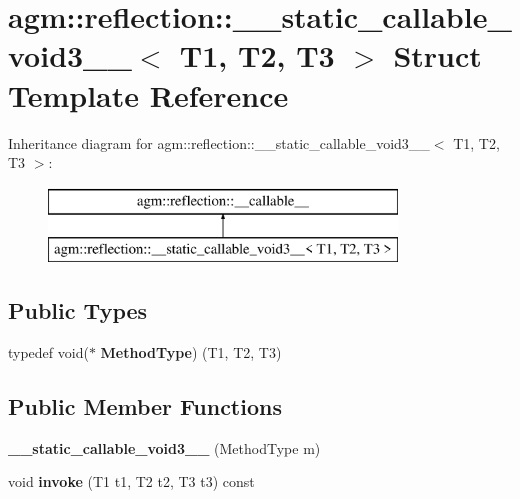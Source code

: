 \hypertarget{structagm_1_1reflection_1_1____static__callable__void3____}{}\section{agm\+:\+:reflection\+:\+:\+\_\+\+\_\+static\+\_\+callable\+\_\+void3\+\_\+\+\_\+$<$ T1, T2, T3 $>$ Struct Template Reference}
\label{structagm_1_1reflection_1_1____static__callable__void3____}
Inheritance diagram for agm\+:\+:reflection\+:\+:\+\_\+\+\_\+static\+\_\+callable\+\_\+void3\+\_\+\+\_\+$<$ T1, T2, T3 $>$\+:\begin{figure}[H]
\begin{center}
\leavevmode
\includegraphics[height=2.000000cm]{structagm_1_1reflection_1_1____static__callable__void3____}
\end{center}
\end{figure}
\subsection*{Public Types}
\begin{DoxyCompactItemize}
\item 
typedef void($\ast$ {\bfseries Method\+Type}) (T1, T2, T3)\hypertarget{structagm_1_1reflection_1_1____static__callable__void3_____a24798d6eab059c8915f41c6222bfe152}{}\label{structagm_1_1reflection_1_1____static__callable__void3_____a24798d6eab059c8915f41c6222bfe152}

\end{DoxyCompactItemize}
\subsection*{Public Member Functions}
\begin{DoxyCompactItemize}
\item 
{\bfseries \+\_\+\+\_\+static\+\_\+callable\+\_\+void3\+\_\+\+\_\+} (Method\+Type m)\hypertarget{structagm_1_1reflection_1_1____static__callable__void3_____a41d7b094ed4233dd67839102c25b77d1}{}\label{structagm_1_1reflection_1_1____static__callable__void3_____a41d7b094ed4233dd67839102c25b77d1}

\item 
void {\bfseries invoke} (T1 t1, T2 t2, T3 t3) const \hypertarget{structagm_1_1reflection_1_1____static__callable__void3_____a8f9fff1f6bc637b4af7ef6d1478e72c2}{}\label{structagm_1_1reflection_1_1____static__callable__void3_____a8f9fff1f6bc637b4af7ef6d1478e72c2}

\end{DoxyCompactItemize}
